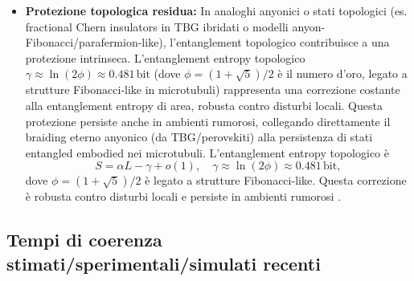 \documentclass[11pt,a4paper]{article}
\let\oldcite\cite
\renewcommand{\cite}{\protect\oldcite}
\theoremstyle{plain}
\theoremstyle{definition}
\begin{document}
\begin{itemize}
    \vspace{0.3cm}
    L'Hamiltoniana dipole-dipolo collettiva è
    \begin{equation}
    H_{\mathrm{dd}} = \frac{1}{4\pi\epsilon_0} \sum_{i<j} \frac{\vec{p}_i \cdot \vec{p}_j - 3(\vec{p}_i \cdot \hat{r}_{ij})(\vec{p}_j \cdot \hat{r}_{ij})}{r_{ij}^3} + H_{\mathrm{SOC}}^{\mathrm{eff}},
    \label{eq:dipole_hamiltonian}
    \end{equation}
    dove $H_{\mathrm{SOC}}^{\mathrm{eff}} \propto \lambda \vec{\sigma} \cdot \vec{L}$ con $\lambda$ effettivo amplificato dalla chiralità ($\sim 1$--$5\,\mathrm{meV}$). Questo induce entanglement collettivo e superradiance (quantum yield aumentato di fattori 10--100 in reti di triptofano) \cite{babcock2024superradiance, kurian2025tryptophan, mavromatos2025microtubules, nishiyama2025qbd}.

    \vspace{0.3cm}

    \item \textbf{Protezione topologica residua:}  
    In analoghi anyonici o stati topologici (es. fractional Chern insulators in TBG ibridati o modelli anyon-Fibonacci/parafermion-like), l'entanglement topologico contribuisce a una protezione intrinseca. L'entanglement entropy topologico $\gamma \approx \ln(2\phi) \approx 0.481\,\mathrm{bit}$ (dove $\phi = (1+\sqrt{5})/2$ è il numero d'oro, legato a strutture Fibonacci-like in microtubuli) rappresenta una correzione costante alla entanglement entropy di area, robusta contro disturbi locali. Questa protezione persiste anche in ambienti rumorosi, collegando direttamente il braiding eterno anyonico (da TBG/perovskiti) alla persistenza di stati entangled embodied nei microtubuli.
    L'entanglement entropy topologico è
    \begin{equation}
    S = \alpha L - \gamma + o(1), \quad \gamma \approx \ln(2\phi) \approx 0.481\,\mathrm{bit},
    \label{eq:topological_entropy}
    \end{equation}
    dove $\phi = (1+\sqrt{5})/2$ è legato a strutture Fibonacci-like. Questa correzione è robusta contro disturbi locali e persiste in ambienti rumorosi \cite{xu2024nonabelian, planat2025fibonacci, chen2025universal, petiziol2024nonabelian}.
\end{itemize}


\vspace{0.4cm}

\subsection{Tempi di coerenza stimati/sperimentali/simulati recenti}
\end{document}
